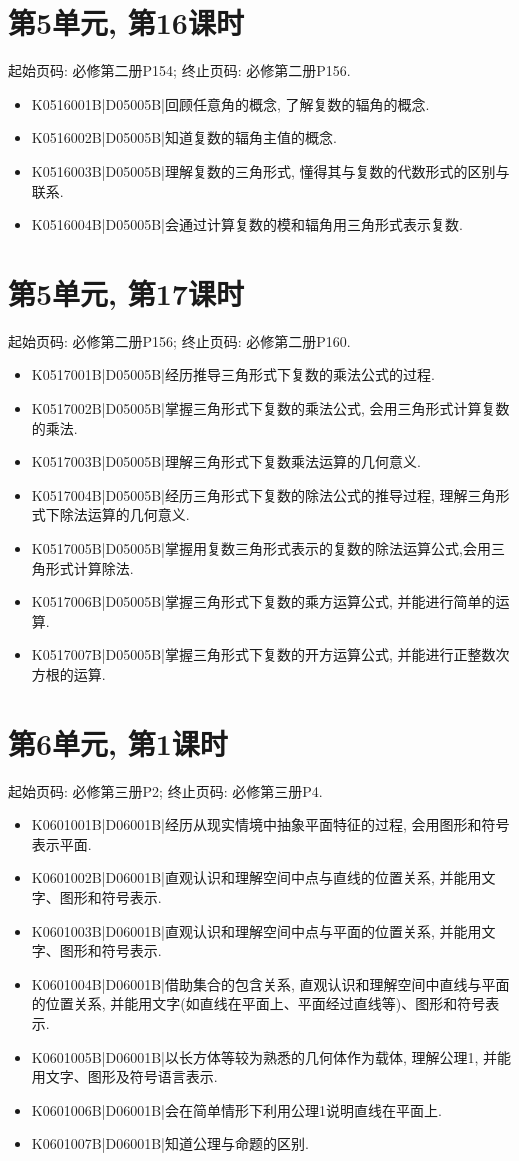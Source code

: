 \section*{第5单元, 第16课时}
起始页码: 必修第二册P154; 终止页码: 必修第二册P156.
\begin{itemize}
\item K0516001B|D05005B|回顾任意角的概念, 了解复数的辐角的概念.
\item K0516002B|D05005B|知道复数的辐角主值的概念.
\item K0516003B|D05005B|理解复数的三角形式, 懂得其与复数的代数形式的区别与联系.
\item K0516004B|D05005B|会通过计算复数的模和辐角用三角形式表示复数.
\end{itemize}

\section*{第5单元, 第17课时}
起始页码: 必修第二册P156; 终止页码: 必修第二册P160.
\begin{itemize}
\item K0517001B|D05005B|经历推导三角形式下复数的乘法公式的过程.
\item K0517002B|D05005B|掌握三角形式下复数的乘法公式, 会用三角形式计算复数的乘法.
\item K0517003B|D05005B|理解三角形式下复数乘法运算的几何意义.
\item K0517004B|D05005B|经历三角形式下复数的除法公式的推导过程, 理解三角形式下除法运算的几何意义.
\item K0517005B|D05005B|掌握用复数三角形式表示的复数的除法运算公式,会用三角形式计算除法.
\item K0517006B|D05005B|掌握三角形式下复数的乘方运算公式, 并能进行简单的运算.
\item K0517007B|D05005B|掌握三角形式下复数的开方运算公式, 并能进行正整数次方根的运算.
\end{itemize}

\section*{第6单元, 第1课时}
起始页码: 必修第三册P2; 终止页码: 必修第三册P4.
\begin{itemize}
\item K0601001B|D06001B|经历从现实情境中抽象平面特征的过程, 会用图形和符号表示平面.
\item K0601002B|D06001B|直观认识和理解空间中点与直线的位置关系, 并能用文字、图形和符号表示.
\item K0601003B|D06001B|直观认识和理解空间中点与平面的位置关系, 并能用文字、图形和符号表示.
\item K0601004B|D06001B|借助集合的包含关系, 直观认识和理解空间中直线与平面的位置关系, 并能用文字(如直线在平面上、平面经过直线等)、图形和符号表示.
\item K0601005B|D06001B|以长方体等较为熟悉的几何体作为载体, 理解公理1, 并能用文字、图形及符号语言表示.
\item K0601006B|D06001B|会在简单情形下利用公理1说明直线在平面上.
\item K0601007B|D06001B|知道公理与命题的区别.
\end{itemize}

